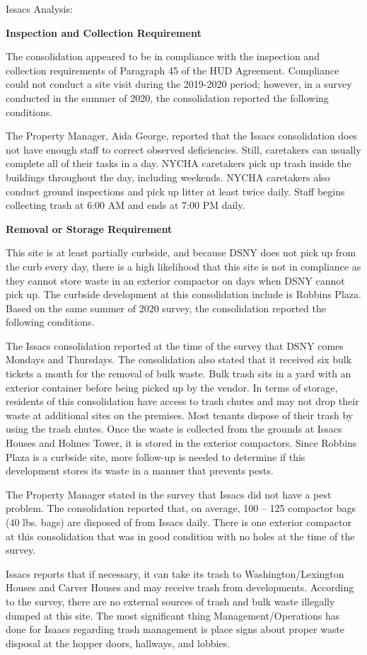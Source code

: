 Issacs Analysis: 

\textbf{Inspection and Collection Requirement} 

 

The consolidation appeared to be in compliance with the inspection and collection requirements of Paragraph 45 of the HUD Agreement. Compliance could not conduct a site visit during the 2019-2020 period; however, in a survey conducted in the summer of 2020, the consolidation reported the following conditions. 

The Property Manager, Aida George, reported that the Issacs consolidation does not have enough staff to correct observed deficiencies. Still, caretakers can usually complete all of their tasks in a day. NYCHA caretakers pick up trash inside the buildings throughout the day, including weekends. NYCHA caretakers also conduct ground inspections and pick up litter at least twice daily. Staff begins collecting trash at 6:00 AM and ends at 7:00 PM daily. 

 

\textbf{Removal or Storage Requirement} 

This site is at least partially curbside, and because DSNY does not pick up from the curb every day, there is a high likelihood that this site is not in compliance as they cannot store waste in an exterior compactor on days when DSNY cannot pick up. The curbside development at this consolidation include is Robbins Plaza. Based on the same summer of  2020  survey, the consolidation reported the following conditions.

 

The Issacs consolidation reported at the time of the survey that DSNY comes Mondays and Thursdays. The consolidation also stated that it received six bulk tickets a month for the removal of bulk waste. Bulk trash sits in a yard with an exterior container before being picked up by the vendor. In terms of storage, residents of this consolidation have access to trash chutes and may not drop their waste at additional sites on the premises. Most tenants dispose of their trash by using the trash chutes. Once the waste is collected from the grounds at Issacs Houses and Holmes Tower, it is stored in the exterior compactors.  Since Robbins Plaza is a curbside site, more follow-up is needed to determine if this development stores its waste in a manner that prevents pests. 

 

The Property Manager stated in the survey that Issacs did not have a pest problem.  The consolidation reported that, on average, 100 -- 125 compactor bags (40 lbs. bags) are disposed of from Issacs daily. There is one exterior compactor at this consolidation that was in good condition with no holes at the time of the survey.

Issacs reports that if necessary, it can take its trash to Washington/Lexington Houses and Carver Houses and may receive trash from developments. According to the survey, there are no external sources of trash and bulk waste illegally dumped at this site. The most significant thing Management/Operations has done for Isaacs regarding trash management is place signs about proper waste disposal at the hopper doors, hallways, and lobbies.